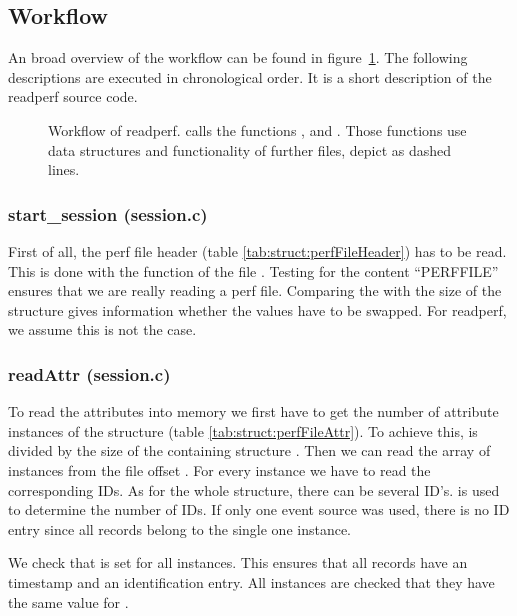 \newcommand{\funcdesc}[2]{\subsubsection{#2 (#1)}}
\subsection{Workflow}
An broad overview of the workflow can be found in figure~\ref{fig:readperfWorkflow}. The following descriptions are executed in chronological order. It is a short description of the readperf source code.

\begin{figure}[ht]
  \centering
  
  \caption[Workflow of readperf]{Workflow of readperf.  calls the functions ,  and . Those functions use data structures and functionality of further files, depict as dashed lines.\label{fig:readperfWorkflow}}
\end{figure}

\funcdesc{session.c}{start\_session}
First of all, the perf file header (table \ref{tab:struct:perfFileHeader}) has to be read. This is done with the function  of the file . Testing  for the content ``PERFFILE'' ensures that we are really reading a perf file. Comparing the  with the size of the structure  gives information whether the values have to be swapped. For readperf, we assume this is not the case.

\funcdesc{session.c}{readAttr}
To read the attributes into memory we first have to get the number of attribute instances of the structure  (table \ref{tab:struct:perfFileAttr}). To achieve this,  is divided by the size of the containing structure . Then we can read the array of instances from the file offset . For every instance we have to read the corresponding IDs. As for the whole structure, there can be several ID's.  is used to determine the number of IDs. If only one event source was used, there is no ID entry since all records belong to the single one  instance.

We check that  is set for all instances. This ensures that all records have an timestamp and an identification entry. All instances are checked that they have the same value for .

